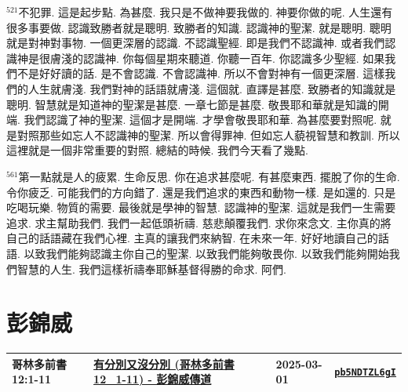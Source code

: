 \documentclass{book}
\begin{document}
$^{521}$不犯罪.
這是起步點.
為甚麼.
我只是不做神要我做的.
神要你做的呢.
人生還有很多事要做.
認識致勝者就是聰明.
致勝者的知識.
認識神的聖潔.
就是聰明.
聰明就是對神對事物.
一個更深層的認識.
不認識聖經.
即是我們不認識神.
或者我們認識神是很膚淺的認識神.
你每個星期來聽道.
你聽一百年.
你認識多少聖經.
如果我們不是好好讀的話.
是不會認識.
不會認識神.
所以不會對神有一個更深層.
這樣我們的人生就膚淺.
我們對神的話語就膚淺.
這個就.
直譯是甚麼.
致勝者的知識就是聰明.
智慧就是知道神的聖潔是甚麼.
一章七節是甚麼.
敬畏耶和華就是知識的開端.
我們認識了神的聖潔.
這個才是開端.
才學會敬畏耶和華.
為甚麼要對照呢.
就是對照那些如忘人不認識神的聖潔.
所以會得罪神.
但如忘人藐視智慧和教訓.
所以這裡就是一個非常重要的對照.
總結的時候.
我們今天看了幾點.

$^{561}$第一點就是人的疲累.
生命反思.
你在追求甚麼呢.
有甚麼東西.
擺脫了你的生命.
令你疲乏.
可能我們的方向錯了.
還是我們追求的東西和動物一樣.
是如還的.
只是吃喝玩樂.
物質的需要.
最後就是學神的智慧.
認識神的聖潔.
這就是我們一生需要追求.
求主幫助我們.
我們一起低頭祈禱.
慈悲顛覆我們.
求你來念文.
主你真的將自己的話語藏在我們心裡.
主真的讓我們來納智.
在未來一年.
好好地讀自己的話語.
以致我們能夠認識主你自己的聖潔.
以致我們能夠敬畏你.
以致我們能夠開始我們智慧的人生.
我們這樣祈禱奉耶穌基督得勝的命求.
阿們.
\newpage



\chapter{彭錦威}\label{ch:preacher3}
\begin{multicols}{3}
\minitoc
\end{multicols}
{ \scriptsize


\begin{xltabular}{\textwidth}{|p{0.15\textwidth} p{0.6\textwidth}|p{0.07\textwidth} p{0.1\textwidth}|}
\hline
哥林多前書 12:1-11 & \hyperref[sec:pb5NDTZL6gI]{有分別又沒分別 (哥林多前書12\_1-11) - 彭錦威傳道} & 2025-03-01 & \href{https://youtube.com/watch?v=pb5NDTZL6gI}{\texttt{pb5NDTZL6gI}} \\
\hline
\end{xltabular}
}
\newpage
\end{document}

